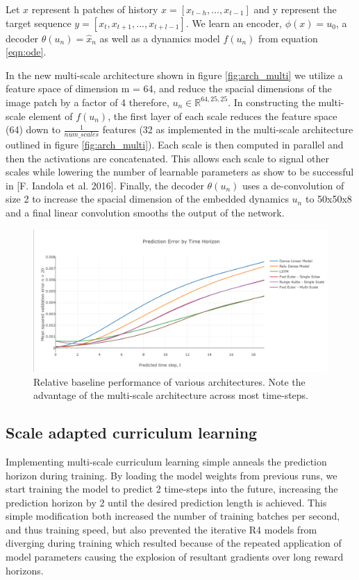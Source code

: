 \documentclass[12pt]{article}
\newcommand{\R}{ \ensuremath{\mathbb{R}}}  %
\theoremstyle{plain}
\theoremstyle{remark}
\theoremstyle{definition}
\begin{document}
Let $x$ represent h patches of history $x = [x_{t-h}, ..., x_{t-1}]$ and y represent the target sequence $y = 
[x_{t}, x_{t+1},...,x_{t+l-1}]$.  We learn an encoder, $\phi(x) = u_0$, a decoder $\theta(u_n) = \hat{x}_n$ as well as a dynamics model $f(u_n)$ from equation \ref{eqn:ode}.  

In the new multi-scale architecture shown in figure \ref{fig:arch_multi} we utilize a feature space of dimension m = 64, and reduce the spacial dimensions of the image patch by a factor of 4 therefore, $u_n \in \R^{64, 25, 25}$. 
In constructing the multi-scale element of $f(u_n)$, the first layer of each scale reduces the feature space (64) down to $\frac{1}{num\_scales}$ features (32 as implemented in the multi-scale architecture outlined in figure \ref{fig:arch_multi}). Each scale is then computed in parallel and then the activations are concatenated. This allows each scale to signal other scales while lowering the number of learnable parameters as show to be successful in [F. Iandola et al. 2016]. Finally, the decoder $\theta(u_n)$ uses a de-convolution of size 2 to increase the spacial dimension of the embedded dynamics $u_n$ to 50x50x8 and a final linear convolution smooths the output of the network.

\begin{figure}
	\centering
	\includegraphics[width=0.95\linewidth]{abs_perf_new}
	\caption{\small Relative baseline performance of various architectures. Note the advantage of the multi-scale architecture across most time-steps.}
	\label{fig:abs_perf_new}
\end{figure}


\subsection{Scale adapted curriculum learning}
Implementing multi-scale curriculum learning simple anneals the prediction horizon during training. By loading the model weights from previous runs, we start training the model to predict 2 time-steps into the future, increasing the prediction horizon by 2 until the desired prediction length is achieved. 
This simple modification both increased the number of training batches per second, and thus training speed, but also prevented the iterative R4 models from diverging during training which resulted because of the repeated application of model parameters causing the explosion of resultant gradients over long reward horizons.
\end{document}
